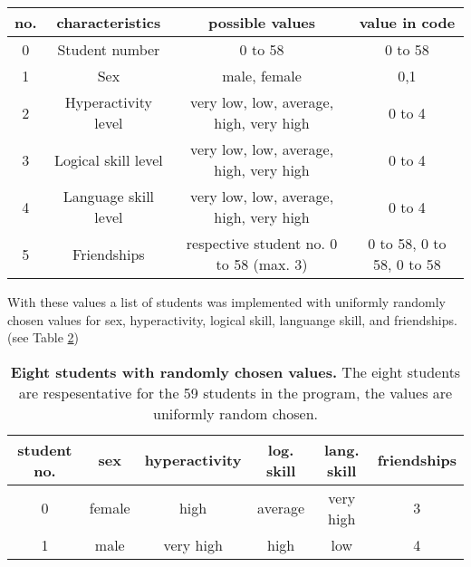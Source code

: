 \begin{onehalfspace}
\begin{table} [H]
    \label{Tab:values} 
    
    \begin{tabular}{c|c|c|c}
        no. & characteristics  & possible values & value in code \\ \hline \hline
        0 & Student number & 0 to 58 &  0 to 58 \\\hline 

        1 & Sex & male, female &  0,1\\ \hline

        2 & Hyperactivity level & very low, low, average, high, very high & 0 to 4   \\ \hline 
        
        3 & Logical skill level & very low, low, average, high, very high & 0 to 4    \\ \hline 
        
        4 & Language skill level& very low, low, average, high, very high & 0 to 4    \\\hline 
        
        5 & Friendships & respective student no. 0 to 58  (max. 3) & 0 to 58, 0 to 58, 0 to 58    \\\hline 
        
        
    \end{tabular}
\end{table}
With these values a list of students was implemented with uniformly randomly chosen values for sex, hyperactivity, logical skill, languange skill, and friendships. (see Table \ref{Tab:8students})

\begin{table} [H]
    \centering
    \caption[Eight students with randomly chosen values]{\textbf{Eight students with randomly chosen values.} The eight students are respesentative for the 59 students in the program, the values are uniformly random chosen.}

    \label{Tab:8students} 

    
    \begin{tabular}{c|c|c|c|c|c}
        student no. & sex & hyperactivity  & log. skill & lang. skill & friendships \\ \hline \hline
        

        0 & female &  high & average & very high & 3\\ \hline

        1 &  male & very high & high & low & 4   \\ \hline 
        

\end{tabular}
\end{table}
\end{onehalfspace}
